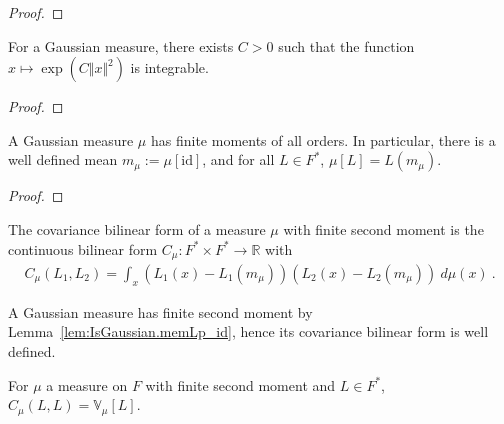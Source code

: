 \begin{proof}\leanok

\end{proof}


\begin{theorem}\label{thm:IsGaussian.exists_integrable_exp_sq}
  \leanok
For a Gaussian measure, there exists $C > 0$ such that the function $x \mapsto \exp (C \Vert x \Vert ^ 2)$ is integrable.
\end{theorem}

\begin{proof}\leanok

\end{proof}


\begin{lemma}\label{lem:IsGaussian.memLp_id}
  \leanok
A Gaussian measure $\mu$ has finite moments of all orders.
In particular, there is a well defined mean $m_\mu := \mu[\mathrm{id}]$, and for all $L \in F^*$, $\mu[L] = L(m_\mu)$.
\end{lemma}

\begin{proof}\leanok

\end{proof}


\begin{definition}[Covariance]\label{def:covarianceBilin}
  \mathlibok
The covariance bilinear form of a measure $\mu$ with finite second moment is the continuous bilinear form $C_\mu : F^* \times F^* \to \mathbb{R}$ with
\begin{align*}
  C_\mu(L_1, L_2) = \int_x (L_1(x) - L_1(m_\mu)) (L_2(x) - L_2(m_\mu)) \: d\mu(x) \: .
\end{align*}
\end{definition}

A Gaussian measure has finite second moment by Lemma~\ref{lem:IsGaussian.memLp_id}, hence its covariance bilinear form is well defined.

\begin{lemma}\label{lem:covarianceBilin_same_eq_variance}
  \mathlibok
For $\mu$ a measure on $F$ with finite second moment and $L \in F^*$, $C_\mu(L, L) = \mathbb{V}_\mu[L]$.
\end{lemma}

